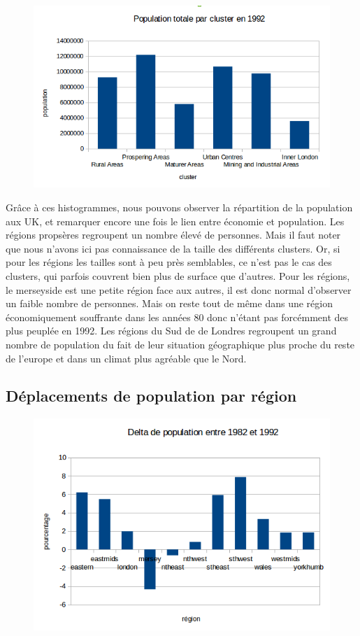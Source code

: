 \begin{figure}[h!]
    \centering
    \includegraphics[width=12.8cm]{images/pop/popCluster.png}
\end{figure}

Grâce à ces histogrammes, nous pouvons observer la répartition de la population aux UK, et remarquer encore une fois le lien entre économie et population. Les régions propsères regroupent un nombre élevé de personnes. Mais il faut noter que nous n'avons ici pas connaissance de la taille des différents clusters. Or, si pour les régions les tailles sont à peu près semblables, ce n'est pas le cas des clusters, qui parfois couvrent bien plus de surface que d'autres. Pour les régions, le merseyside est une petite région face aux autres, il est donc normal d'observer un faible nombre de personnes. Mais on reste tout de même dans une région économiquement souffrante dans les années 80 donc n'étant pas forcémment des plus peuplée en 1992.
Les régions du Sud de de Londres regroupent un grand nombre de population du fait de leur situation géographique plus proche du reste de l'europe et dans un climat plus agréable que le Nord.

\pagebreak


\subsection{Déplacements de population par région}
\begin{figure}[h!]
    \centering
    \includegraphics[width=\linewidth]{images/pop/deltaPopRegions.png}
\end{figure}

